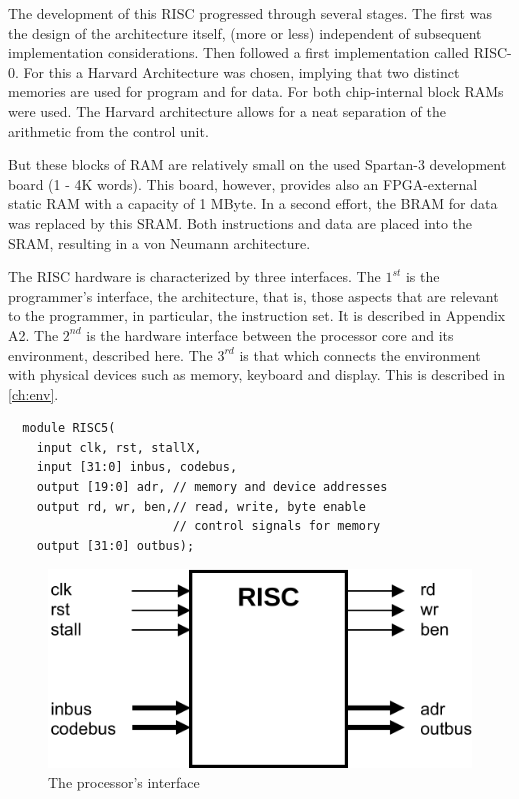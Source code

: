 The development of this RISC progressed through several stages. The first was the design of the
architecture itself, (more or less) independent of subsequent implementation considerations. Then
followed a first implementation called RISC-0. For this a Harvard Architecture was chosen, implying
that two distinct memories are used for program and for data. For both chip-internal block RAMs
were used. The Harvard architecture allows for a neat separation of the arithmetic from the control
unit.

But these blocks of RAM are relatively small on the used Spartan-3 development board (1 - 4K
words). This board, however, provides also an FPGA-external static RAM with a capacity of 1
MByte. In a second effort, the BRAM for data was replaced by this SRAM. Both instructions and
data are placed into the SRAM, resulting in a von Neumann architecture.

The RISC hardware is characterized by three interfaces. The $1^{st}$ is the programmer's interface, the
architecture, that is, those aspects that are relevant to the programmer, in particular, the instruction
set. It is described in Appendix A2. The $2^{nd}$ is the hardware interface between the processor
core and its environment, described here. The $3^{rd}$ is that which connects the environment with
physical devices such as memory, keyboard and display. This is described in \ref{ch:env}.

\begin{verbatim}
  module RISC5(
    input clk, rst, stallX,
    input [31:0] inbus, codebus,
    output [19:0] adr, // memory and device addresses
    output rd, wr, ben,// read, write, byte enable
                       // control signals for memory
    output [31:0] outbus);
\end{verbatim}

\begin{figure}[h!]
	\centering
	\includegraphics[width=.96\textwidth]{i/F/1.png}
	\caption{The processor's interface}
	\label{fig:processor}
\end{figure}

